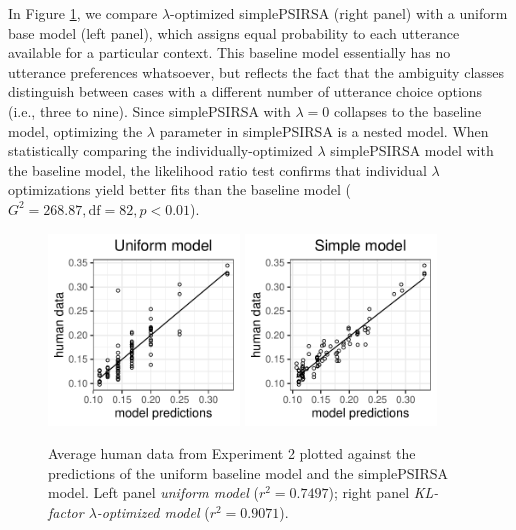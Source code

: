 \documentclass[10pt,a4paper]{article}
\newcommand{\gcs}[1]{\textcolor{blue}{[gcs: #1]}}
\begin{document}

In Figure \ref{kl-factor}, we compare $\lambda$-optimized simplePSIRSA (right panel) with a uniform base model (left panel), which assigns equal probability to each utterance available for a particular context.
This baseline model essentially has no utterance  preferences whatsoever, but reflects the fact that the ambiguity classes distinguish between cases with a different number of utterance choice options (i.e., three to nine).
 Since simplePSIRSA with $\lambda=0$ collapses to the baseline model, optimizing the $\lambda$ parameter in simplePSIRSA is a nested model. 
 When statistically comparing the individually-optimized $\lambda$ simplePSIRSA model with the baseline model, the likelihood ratio test confirms that individual $\lambda$ optimizations yield better fits than the baseline model ($G^2 = 268.87, \textrm{df} = 82, p <0.01$).

\begin{figure}[ht]
	\centering
	\includegraphics[width=2in]{images/x3_m20.pdf}
	\includegraphics[width=2in]{images/x3_m11.pdf}
	\caption{Average human data from Experiment 2 plotted against the predictions of the uniform baseline model and the simplePSIRSA model. Left panel \emph{uniform model} ($r^{2}=0.7497$); right panel \emph{KL-factor $\lambda$-optimized model} ($r^{2}=0.9071$). }\label{kl-factor}
\end{figure}
\end{document}
